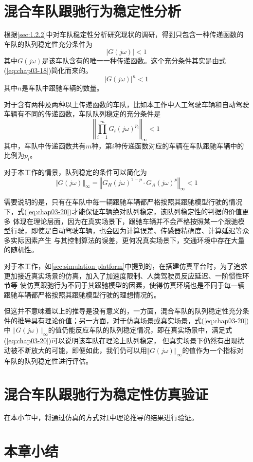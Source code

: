 \section{混合车队跟驰行为稳定性分析}
\label{sec:3.3}

根据\ref{sec:1.2.2}中对车队稳定性分析研究现状的调研，得到只包含一种传递函数的车队的队列稳定性充分条件为
\begin{equation}
  | G(j\omega) | < 1
  \label{eq:chap03-17}
\end{equation}
其中$G(j\omega)$是该车队含有的唯一一种传递函数。这个充分条件其实是由式(\ref{eq:chap03-18})简化而来的。
\begin{equation}
  | G(j\omega) |^n < 1
  \label{eq:chap03-18}
\end{equation}
其中$n$是车队中跟驰车辆的数量。

对于含有两种及两种以上传递函数的车队，比如本工作中人工驾驶车辆和自动驾驶车辆有不同的传递函数，车队队列稳定的充分条件是
\begin{equation}
  \left\Vert \prod_{i=1}^{m}{G_i(j\omega)^{p_i}} \right\Vert_{\infty} < 1
  \label{eq:chap03-19}
\end{equation}
其中，车队中传递函数共有$m$种，第$i$种传递函数对应的车辆在车队跟驰车辆中的比例为$p_i$。

对于本工作的情景，队列稳定的条件可以简化为
\begin{equation}
  \left\Vert G(j\omega) \right\Vert_{\infty} = \left\Vert G_H(j\omega)^{1-p} \cdot G_A(j\omega)^p \right\Vert_{\infty} < 1
  \label{eq:chap03-20}
\end{equation}

需要说明的是，只有在车队中每一辆跟驰车辆都严格按照其跟驰模型行驶的情况下，式(\ref{eq:chap03-20})才能保证车辆绝对队列稳定，该队列稳定性的判据的价值更多
体现在理论层面，因为在真实场景下，跟驰车辆并不会严格按照某一个跟驰模型行驶，即使是自动驾驶车辆，也会因为计算误差、传感器精确度、计算延迟等众多实际因素产生
与其控制算法的误差，更何况真实场景下，交通环境中存在大量的随机性。

对于本工作，如\ref{sec:simulation-platform}中提到的，在搭建仿真平台时，为了追求更加接近真实场景的仿真，加入了加速度限制、人类驾驶员反应延迟、一阶惯性环节等
使仿真跟驰行为不同于其跟驰模型的因素，使得仿真环境也是不同于每一辆跟驰车辆都严格按照其跟驰模型行驶的理想情况的。

但这并不意味着以上的推导是没有意义的，一方面，混合车队的队列稳定性充分条件的推导具有理论价值；另一方面，对于仿真场景或真实场景，式(\ref{eq:chap03-20})中
$\left\Vert G(j\omega) \right\Vert_{\infty}$的值仍能反应车队的队列稳定情况，即在真实场景中，满足式(\ref{eq:chap03-20})可以说明该车队在理论上队列稳定，
但真实场景下仍然有出现扰动被不断放大的可能，即便如此，我们仍可以用$\left\Vert G(j\omega) \right\Vert_{\infty}$的值作为一个指标对车队的队列稳定性进行评估。


\section{混合车队跟驰行为稳定性仿真验证}

在本小节中，将通过仿真的方式对\ref{sec:3.3}中理论推导的结果进行验证。

\section{本章小结}